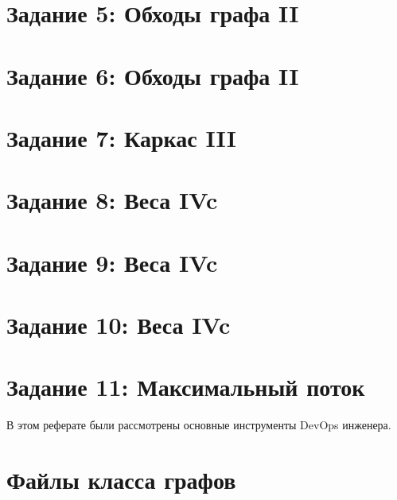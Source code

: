 \documentclass[otchet]{SCWorks}
\begin{document}
\section{Задание 5: Обходы графа II}
\section{Задание 6: Обходы графа II}
\section{Задание 7: Каркас III}
\section{Задание 8: Веса IVc}
\section{Задание 9: Веса IVc}
\section{Задание 10: Веса IVc}
\section{Задание 11: Максимальный поток}


\conclusion

В этом реферате были рассмотрены основные инструменты DevOps инженера. 

%

\nocite{*}




\appendix
\section{Файлы класса графов}
\label{Graph}
\end{document}
